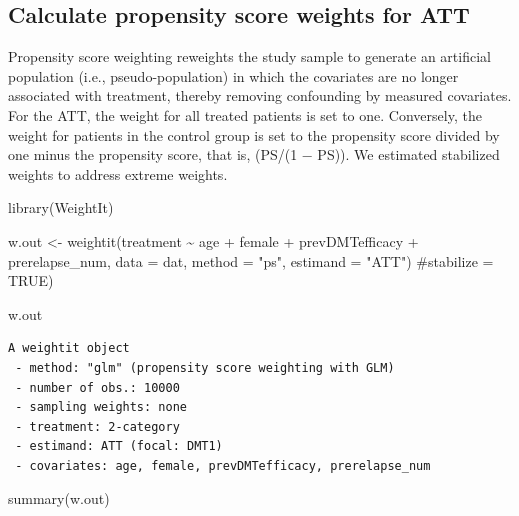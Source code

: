 \documentclass[
  letterpaper,
  DIV=11,
  numbers=noendperiod]{scrreprt}
\newenvironment{Shaded}{\begin{snugshade}}{\end{snugshade}}
\newcommand{\AttributeTok}[1]{\textcolor[rgb]{0.40,0.45,0.13}{#1}}
\newcommand{\CommentTok}[1]{\textcolor[rgb]{0.37,0.37,0.37}{#1}}
\newcommand{\FunctionTok}[1]{\textcolor[rgb]{0.28,0.35,0.67}{#1}}
\newcommand{\NormalTok}[1]{\textcolor[rgb]{0.00,0.23,0.31}{#1}}
\newcommand{\OtherTok}[1]{\textcolor[rgb]{0.00,0.23,0.31}{#1}}
\newcommand{\SpecialCharTok}[1]{\textcolor[rgb]{0.37,0.37,0.37}{#1}}
\newcommand{\StringTok}[1]{\textcolor[rgb]{0.13,0.47,0.30}{#1}}
\begin{document}
\hypertarget{calculate-propensity-score-weights-for-att}{%
\subsection{Calculate propensity score weights for
ATT}\label{calculate-propensity-score-weights-for-att}}

Propensity score weighting reweights the study sample to generate an
artificial population (i.e., pseudo-population) in which the covariates
are no longer associated with treatment, thereby removing confounding by
measured covariates. For the ATT, the weight for all treated patients is
set to one. Conversely, the weight for patients in the control group is
set to the propensity score divided by one minus the propensity score,
that is, (PS/(1 − PS)). We estimated stabilized weights to address
extreme weights.

\begin{Shaded}
\begin{Highlighting}[]
\FunctionTok{library}\NormalTok{(WeightIt)}

\NormalTok{w.out }\OtherTok{\textless{}{-}} \FunctionTok{weightit}\NormalTok{(treatment }\SpecialCharTok{\textasciitilde{}}\NormalTok{ age }\SpecialCharTok{+}\NormalTok{ female }\SpecialCharTok{+}\NormalTok{ prevDMTefficacy }\SpecialCharTok{+}\NormalTok{ prerelapse\_num,}
                  \AttributeTok{data =}\NormalTok{ dat,}
                  \AttributeTok{method =} \StringTok{"ps"}\NormalTok{,}
                  \AttributeTok{estimand =} \StringTok{"ATT"}\NormalTok{)}
                  \CommentTok{\#stabilize = TRUE)}

\NormalTok{w.out}
\end{Highlighting}
\end{Shaded}

\begin{verbatim}
A weightit object
 - method: "glm" (propensity score weighting with GLM)
 - number of obs.: 10000
 - sampling weights: none
 - treatment: 2-category
 - estimand: ATT (focal: DMT1)
 - covariates: age, female, prevDMTefficacy, prerelapse_num
\end{verbatim}

\begin{Shaded}
\begin{Highlighting}[]
\FunctionTok{summary}\NormalTok{(w.out)}
\end{Highlighting}
\end{Shaded}
\end{document}
